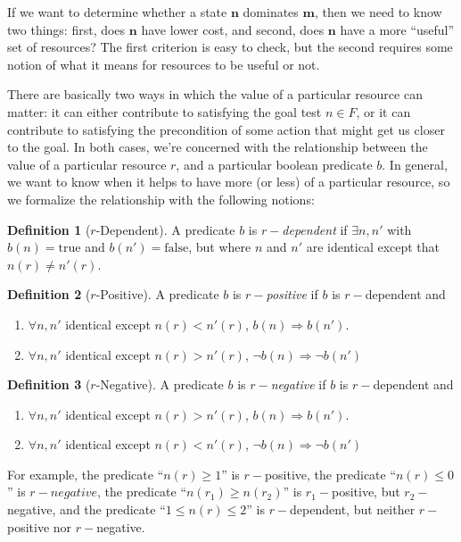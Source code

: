 \documentclass[letterpaper]{article}
\theoremstyle{plain} \newtheorem{theorem}{Theorem} \newtheorem{proposition}{Proposition} \newtheorem{lemma}{Lemma}
\theoremstyle{definition} \newtheorem{definition}{Definition} \newtheorem{conjecture}{Conjecture} \newtheorem*{example}{Example}
\theoremstyle{remark} \newtheorem*{remark}{Remark} \newtheorem*{note}{Note} \newtheorem{case}{Case}
\begin{document}
If we want to determine whether a state $\mathbf{n}$ dominates $\mathbf{m}$, then we need
to know two things: first, does $\mathbf{n}$ have lower cost, and second, does $\mathbf{n}$
have a more ``useful'' set of resources? The first criterion is easy to check, but the
second requires some notion of what it means for resources to be useful or not.

There are basically two ways in which the value of a particular resource can matter: it can
either contribute to satisfying the goal test $n \in F$, or it can contribute to satisfying
the precondition of some action that might get us closer to the goal. In both cases, we're
concerned with the relationship between the value of a particular resource $r$, and a
particular boolean predicate $b$. In general, we want to know when it helps to have more (or less) of a particular resource, so we formalize the relationship with the following notions:
\begin{definition}[$r$-Dependent]
A predicate $b$ is $r-$\textit{dependent} if $\exists n, n'$ with $b(n) = \text{true}$ and $b(n') = \text{false}$, but where $n$ and $n'$ are identical except that $n(r) \ne n'(r)$.
\end{definition}
\begin{definition}[$r$-Positive]
	A predicate $b$ is $r-$\textit{positive} if $b$ is $r-$dependent and
	\begin{enumerate}
		\item $\forall n, n'$ identical except $n(r) < n'(r)$, $b(n) \Rightarrow b(n').$
		\item $\forall n, n'$ identical except $n(r) > n'(r)$, $\neg b(n) \Rightarrow \neg b(n')$
	\end{enumerate}
\end{definition}
\begin{definition}[$r$-Negative]
	A predicate $b$ is $r-$\textit{negative} if $b$ is $r-$dependent and
	\begin{enumerate}
		\item $\forall n, n'$ identical except $n(r) > n'(r)$, $b(n) \Rightarrow b(n').$
		\item $\forall n, n'$ identical except $n(r) < n'(r)$, $\neg b(n) \Rightarrow \neg b(n')$
	\end{enumerate}
\end{definition}
For example, the predicate ``$n(r) \ge 1$'' is $r-$positive, the predicate ``$n(r) \le 0$'' is $r-negative$, the predicate ``$n(r_1) \ge n(r_2)$'' is $r_1-$positive, but $r_2-$negative, and the predicate ``$1 \le n(r) \le 2$'' is $r-$dependent, but neither $r-$positive nor $r-$negative.
\end{document}
